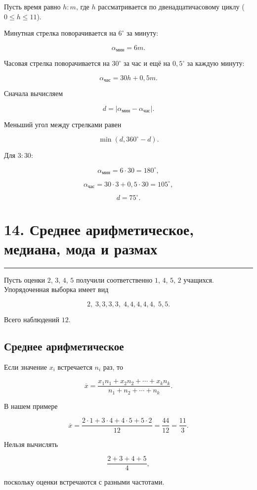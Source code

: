 \documentclass[a4paper,12pt]{article}
\newcommand{\sectionline}{%
    \vspace{-0.15em}
    {\color{accent}\hrule height 0.7pt}
    \vspace{0.55em}
}
\newcommand{\formula}[1]{%
    \[
        \boxed{\displaystyle #1}
    \]
}
\begin{document}
Пусть время равно $h:m$, где $h$ рассматривается по двенадцатичасовому циклу
($0\le h\le 11$).

Минутная стрелка поворачивается на $6^\circ$ за минуту:

\[
\alpha_{\text{мин}}=6m.
\]

Часовая стрелка поворачивается на $30^\circ$ за час и ещё на $0{,}5^\circ$ за
каждую минуту:

\[
\alpha_{\text{час}}=30h+0{,}5m.
\]

Сначала вычисляем

\[
d=
\left|
\alpha_{\text{мин}}-\alpha_{\text{час}}
\right|.
\]

Меньший угол между стрелками равен

\formula{\min\left(d,360^\circ-d\right).}

Для $3{:}30$:

\[
\alpha_{\text{мин}}=6\cdot30=180^\circ,
\]

\[
\alpha_{\text{час}}
=
30\cdot3+0{,}5\cdot30
=
105^\circ,
\]

\[
d=75^\circ.
\]

\section*{\color{darkaccent}14. Среднее арифметическое, медиана, мода и размах}
\sectionline

Пусть оценки $2$, $3$, $4$, $5$ получили соответственно $1$, $4$, $5$, $2$
учащихся. Упорядоченная выборка имеет вид

\[
2,\;
3,3,3,3,\;
4,4,4,4,4,\;
5,5.
\]

Всего наблюдений $12$.

\subsection*{Среднее арифметическое}

Если значение $x_i$ встречается $n_i$ раз, то

\formula{
\overline{x}
=
\frac{x_1n_1+x_2n_2+\cdots+x_kn_k}
{n_1+n_2+\cdots+n_k}.
}

В нашем примере

\[
\overline{x}
=
\frac{2\cdot1+3\cdot4+4\cdot5+5\cdot2}{12}
=
\frac{44}{12}
=
\frac{11}{3}.
\]

Нельзя вычислять

\[
\frac{2+3+4+5}{4},
\]

поскольку оценки встречаются с разными частотами.
\end{document}
